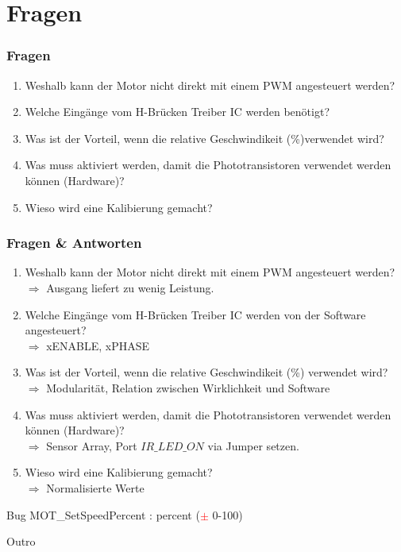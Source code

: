 \documentclass{beamer}
\begin{document}
\section{Fragen} %
\begin{frame}
	\frametitle{Fragen}
	\begin{enumerate}
		\item{Weshalb kann der Motor nicht direkt mit einem PWM angesteuert werden?}
		\item{Welche Eingänge vom H-Brücken Treiber IC werden benötigt?}
		\item{Was ist der Vorteil, wenn die relative Geschwindikeit (\%)verwendet wird?}
		\item{Was muss aktiviert werden, damit die Phototransistoren verwendet werden können (Hardware)?}
		\item{Wieso wird eine Kalibierung gemacht?}
	\end{enumerate}
\end{frame}
\begin{frame}
	\frametitle{Fragen \& Antworten}
	\begin{enumerate}
		\item{Weshalb kann der Motor nicht direkt mit einem PWM angesteuert werden?}
		\\$\Rightarrow$ Ausgang liefert zu wenig Leistung.
		\item{Welche Eingänge vom H-Brücken Treiber IC werden von der Software angesteuert?}
		\\$\Rightarrow$ xENABLE, xPHASE
		\item{Was ist der Vorteil, wenn die relative Geschwindikeit (\%) verwendet wird?}
		\\$\Rightarrow$ Modularität, Relation zwischen Wirklichkeit und Software
		\item{Was muss aktiviert werden, damit die Phototransistoren verwendet werden können (Hardware)?}
		\\$\Rightarrow$ Sensor Array, Port $IR\_LED\_ON$ via Jumper setzen.
		\item{Wieso wird eine Kalibierung gemacht?}
		\\$\Rightarrow$ Normalisierte Werte
	\end{enumerate}
\end{frame}
\begin{frame}
	\begin{exampleblock}{Bug}
	\centering
		MOT\_SetSpeedPercent : percent (\textcolor{red}{$\pm$} 0-100)
	\end{exampleblock}
\end{frame}
\begin{frame}
	\Huge{\centerline{Outro}}
\end{frame}
\end{document}
